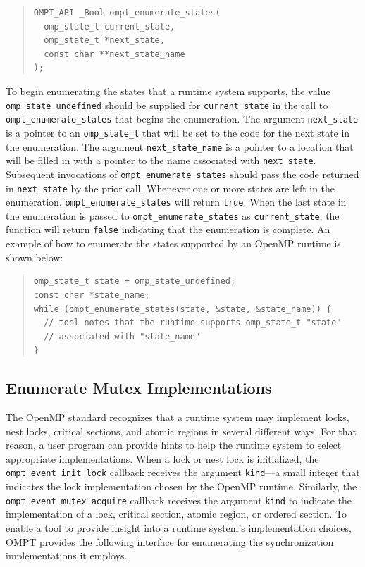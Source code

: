 \documentclass{article}
\begin{document}
\begin{quote}
\begin{lstlisting}
OMPT_API _Bool ompt_enumerate_states(
  omp_state_t current_state, 
  omp_state_t *next_state, 
  const char **next_state_name
);
\end{lstlisting}
\end{quote}

\noindent
To begin enumerating the states that a runtime system supports,
the value \lstinline|omp_state_undefined| should be supplied for \lstinline|current_state| in the call to \lstinline|ompt_enumerate_states| that begins the enumeration.
The argument \lstinline|next_state| is a pointer to an \lstinline|omp_state_t| that will be set to the code for the next state in the enumeration.
The argument \lstinline|next_state_name| is a pointer to a location that will be filled in with a pointer to the name associated with \lstinline|next_state|. 
Subsequent invocations of \lstinline|ompt_enumerate_states| should pass the code returned in \lstinline|next_state| by the prior call.
Whenever one or more states are left in the enumeration, \lstinline|ompt_enumerate_states| will return \lstinline|true|.
When the last state in the enumeration is passed to \lstinline|ompt_enumerate_states| as \lstinline|current_state|, the function will return \lstinline|false| indicating that the enumeration is complete.
An example of how to enumerate the states supported by an OpenMP runtime is shown below:

\begin{quote}
\begin{lstlisting}
omp_state_t state = omp_state_undefined;
const char *state_name;
while (ompt_enumerate_states(state, &state, &state_name)) {
  // tool notes that the runtime supports omp_state_t "state" 
  // associated with "state_name" 
}
\end{lstlisting}
\end{quote}

 \subsection{Enumerate Mutex Implementations}
 \label{ompt_enumerate_mutex_kinds}

The OpenMP standard recognizes that a runtime system may implement locks, nest locks, critical sections, and atomic regions in several different ways. For that reason, a user program can provide hints to help the runtime system to select appropriate implementations.
When a lock or nest lock is initialized, the \lstinline|ompt_event_init_lock| callback receives the argument \lstinline|kind|---a small integer that indicates the lock implementation chosen by the OpenMP runtime. Similarly,  the \lstinline|ompt_event_mutex_acquire| callback receives the argument \lstinline|kind| to indicate 
the implementation of a lock, critical section, atomic region, or ordered section. To enable a tool to provide insight into a runtime system's implementation choices, OMPT provides
the following interface for enumerating the synchronization implementations it employs.
\end{document}
